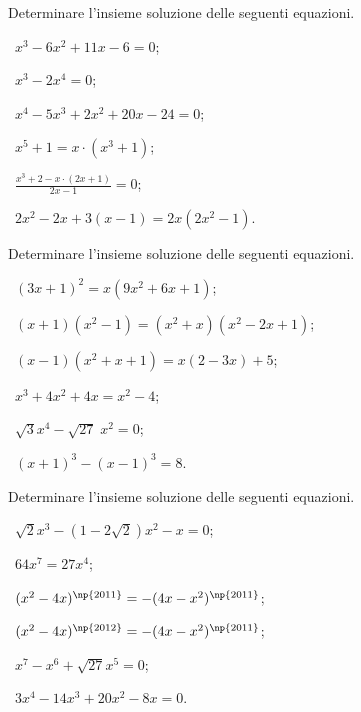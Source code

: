 \begin{esercizio}[\Ast]
 \label{ese:5.7}
Determinare l'insieme soluzione delle seguenti equazioni.
\begin{multicols}{2}
 \begin{enumeratea}
 \item~$x^3-6x^2+11x-6=0$;
 \item~$x^3-2x^4=0$;
 \item~$x^4-5x^3+2x^2+20x-24=0$;
 \item~$x^5+1=x\cdot \left(x^3+1\right)$;
 \item~$\frac{x^3+2-x\cdot (2x+1)}{2x-1}=0$;
 \item~$2x^2-2x+3(x-1)=2x\left(2x^2-1\right)$.
 \end{enumeratea}
 \end{multicols}
\end{esercizio}
\pagebreak
\begin{esercizio}[\Ast]
 \label{ese:5.8}
Determinare l'insieme soluzione delle seguenti equazioni.
 \begin{enumeratea}
 \item~$(3x+1)^2=x\left(9x^2+6x+1\right)$;
 \item~$(x+1)\left(x^2-1\right)=\left(x^2+x\right)\left(x^2-2x+1\right)$;
 \item~$(x-1)(x^2+x+1)=x(2-3x)+5$;
 \item~$x^3+4x^2+4x=x^2-4$;
 \item~$\sqrt 3 x^4-\sqrt{27}\;x^2=0$;
 \item~$ (x+1)^3-(x-1)^3=8 $.
 \end{enumeratea}
\end{esercizio}

\begin{esercizio}[\Ast]
 \label{ese:5.9}
Determinare l'insieme soluzione delle seguenti equazioni.
\begin{multicols}{2}
 \begin{enumeratea}
 \item~$\sqrt 2x^3-(1-2\sqrt 2)x^2-x=0$;
 \item~$64x^7=27x^4$;
 \item~$(x^2-4x)^{\np{2011}}=-(4x-x^2)^{\np{2011}}$;
 \item~$(x^2-4x)^{\np{2012}}=-(4x-x^2)^{\np{2011}}$;
 \item~$x^7-x^6+\sqrt{27}x^5=0$;
 \item~$3x^4-14x^3+20x^2-8x=0$.
 \end{enumeratea}
 \end{multicols}
\end{esercizio}

